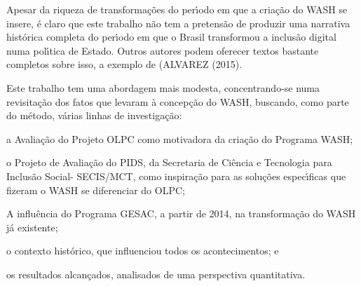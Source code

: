 \documentclass[
12pt,		%
openright,	%
twoside,  %
a4paper,			%
chapter=TITLE,		%
english,			%
french,				%
spanish,			%
brazil				%
]{USPSC-classe/USPSC}
\begin{document}
Apesar da riqueza de transforma\c{c}\~oes do per\'{\i}odo em que a cria\c{c}\~ao do WASH se insere, \'e claro que este trabalho n\~ao tem a pretens\~ao de produzir uma narrativa hist\'orica completa do per\'{\i}odo em que o Brasil transformou a inclus\~ao digital numa pol\'{\i}tica de Estado. Outros autores podem oferecer textos bastante completos sobre isso, a exemplo de  (ALVAREZ (2015).

















Este trabalho tem uma abordagem mais modesta, concentrando-se numa revisita\c{c}\~ao dos fatos que levaram \`a concep\c{c}\~ao do WASH, buscando, como parte do m\'etodo, v\'arias linhas de investiga\c{c}\~ao:


















\begin{alineas}
\item a Avalia\c{c}\~ao do Projeto OLPC como motivadora da cria\c{c}\~ao do Programa WASH;
\item o Projeto de Avalia\c{c}\~ao do PIDS, da Secretaria de Ci\^encia e Tecnologia para Inclus\~ao Social- SECIS/MCT, como inspira\c{c}\~ao para as solu\c{c}\~oes espec\'{\i}ficas que fizeram o WASH se diferenciar do OLPC;
\item A influ\^encia do Programa GESAC, a partir de 2014, na transforma\c{c}\~ao do WASH j\'a existente;
\item o contexto hist\'orico, que influenciou todos os acontecimentos; e
\item os resultados alcan\c{c}ados, analisados de uma perspectiva quantitativa.
\end{alineas}
\end{document}
